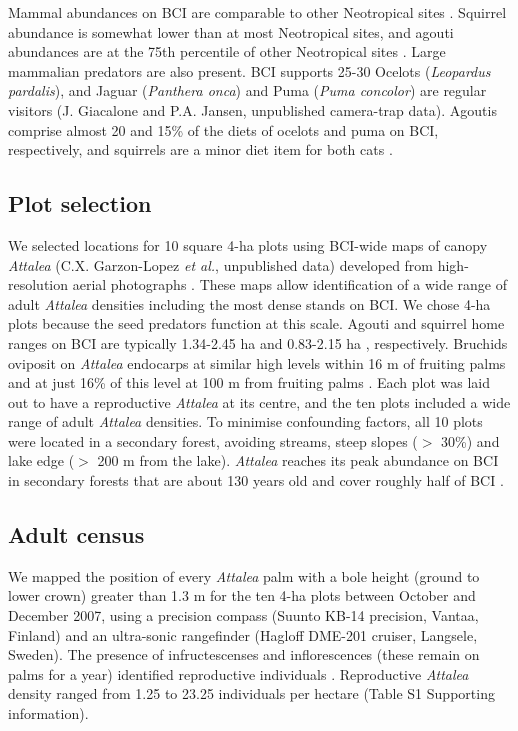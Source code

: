 \documentclass[b5paper,justified]{tufte-book} %
\begin{document}
\begin{fullwidth}
Mammal abundances on BCI are comparable to other Neotropical sites \citep{Wright1994}. Squirrel abundance is somewhat lower than at most Neotropical sites, and agouti abundances are at the 75th percentile of other Neotropical sites \citep{Wright1994}. Large mammalian predators are also present. BCI supports 25-30 Ocelots (\textit{Leopardus pardalis}), and Jaguar (\textit{Panthera onca}) and Puma (\textit{Puma concolor}) are regular visitors (J. Giacalone and P.A. Jansen, unpublished camera-trap data). Agoutis comprise almost 20 and 15\% of the diets of ocelots
and puma on BCI, respectively, and squirrels are a minor diet item for both cats \citep{Moreno2006}.

\subsection{Plot selection}
We selected locations for 10 square 4-ha plots using BCI-wide maps of canopy \textit{Attalea} (C.X. Garzon-Lopez \emph{et al.}, unpublished data) developed from high-resolution aerial photographs \citep{Jansen2008}. These maps allow identification of a wide range of adult \textit{Attalea} densities including the most dense stands on BCI. We chose
4-ha plots because the seed predators function at this scale. Agouti and squirrel home ranges on BCI are typically 1.34-2.45 ha \citep{Aliaga-Rossel2008} and 0.83-2.15 ha \citep{Heaney1978}, respectively. Bruchids oviposit on \textit{Attalea} endocarps at similar high levels within 16 m of fruiting palms and at just 16\% of this level at
100 m from fruiting palms \citep{Wright1983}. Each plot was laid out to have a reproductive \textit{Attalea} at its centre, and the ten plots included a wide range of adult \textit{Attalea} densities. To minimise confounding
factors, all 10 plots were located in a secondary forest, avoiding streams, steep slopes ($>$ 30\%) and lake edge ($>$ 200 m from the lake). \textit{Attalea} reaches its peak abundance on BCI in secondary forests that are about 130 years old and cover roughly half of BCI \citep{Svenning2004}.

\subsection{Adult census}
We mapped the position of every \textit{Attalea} palm with a bole height (ground to lower crown) greater than 1.3 m for the ten 4-ha plots between October and December 2007, using a precision compass (Suunto KB-14 precision, Vantaa, Finland) and an ultra-sonic rangefinder (Hagloff DME-201 cruiser, Langsele, Sweden). The presence of infructescenses and inflorescences (these remain on palms for a year) identified reproductive individuals \citep{Wright1983}. Reproductive \textit{Attalea} density ranged from 1.25 to 23.25 individuals per hectare (Table S1 Supporting information).


\end{fullwidth}
\end{document}
